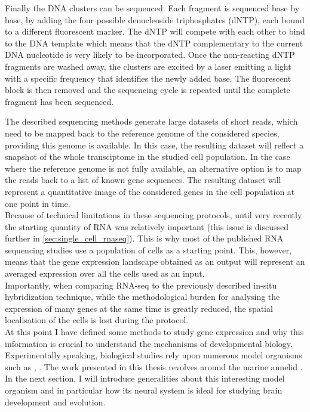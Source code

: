 \begin{itemize}
	 Finally the DNA clusters can be sequenced. Each fragment is sequenced base by base, by adding the four possible denucleoside triphosphates (dNTP), each bound to a different fluorescent marker. The dNTP will compete with each other to bind to the DNA template which means that the dNTP complementary to the current DNA nucleotide is very likely to be incorporated. Once the non-reacting dNTP fragments are washed away, the clusters are excited by a laser emitting a light with a specific frequency that identifies the newly added base. The fluorescent block is then removed and the sequencing cycle is repeated until the complete fragment has been sequenced.
    
\end{itemize}     
    
    The described sequencing methods generate large datasets of short reads, which need to be mapped back to the reference genome of the considered species, providing this genome is available. In this case, the resulting dataset will reflect a snapshot of the whole transciptome in the studied cell population. In the case where the reference genome is not fully available, an alternative option is to map the reads back to a list of known gene sequences. The resulting dataset will represent a quantitative image of the considered genes in the cell population at one point in time.\\
    
    Because of technical limitations in these sequencing protocols, until very recently the starting quantity of RNA was relatively important (this issue is discussed further in \ref{sec:single_cell_rnaseq}). This is why most of the published RNA sequencing studies use a population of cells as a starting point. This, however, means that the gene expression landscape obtained as an output will represent an averaged expression over all the cells used as an input.\\
    
    Importantly, when comparing RNA-seq to the previously described in-situ hybridization technique, while the methodological burden for analysing the expression of many genes at the same time is greatly reduced, the spatial localisation of the cells is lost during the protocol.\\
    
    At this point I have defined some methods to study gene expression and why this information is crucial to understand the mechanisms of developmental biology. Experimentally speaking, biological studies rely upon numerous model organisms such as , . The work presented in this thesis revolves around the marine annelid \platyfull{}. In the next section, I will introduce generalities about this interesting model organism and in particular how its neural system is ideal for studying brain development and evolution.
    

